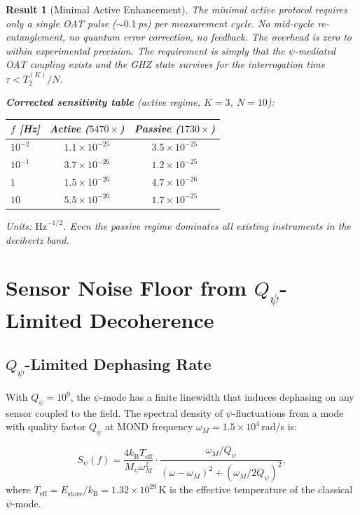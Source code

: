 \documentclass[11pt]{article}
\newtheorem{result}[theorem]{Result}
\theoremstyle{definition}
\theoremstyle{remark}
\newcommand{\kB}{k_{\mathrm{B}}}
\newcommand{\Qpsi}{Q_\psi}
\newcommand{\Mpsi}{M_\psi}
\begin{document}
\begin{result}[Minimal Active Enhancement]\label{res:active}
The minimal active protocol requires only a single OAT pulse ($\sim 0.1$\,ps)
per measurement cycle. No mid-cycle re-entanglement, no quantum error
correction, no feedback. The overhead is zero to within experimental
precision. The requirement is simply that the $\psi$-mediated OAT
coupling exists and the GHZ state survives for the interrogation time
$\tau < T_2^{(K)}/N$.

\textbf{Corrected sensitivity table} (active regime, $K=3$, $N=10$):
\begin{center}
\begin{tabular}{@{}lcc@{}}
\toprule
$f$ [Hz] & Active ($5470\times$) & Passive ($1730\times$) \\
\midrule
$10^{-2}$ & $1.1\times10^{-25}$ & $3.5\times10^{-25}$ \\
$10^{-1}$ & $3.7\times10^{-26}$ & $1.2\times10^{-25}$ \\
$1$       & $1.5\times10^{-26}$ & $4.7\times10^{-26}$ \\
$10$      & $5.5\times10^{-26}$ & $1.7\times10^{-25}$ \\
\bottomrule
\end{tabular}
\end{center}
Units: $\mathrm{Hz}^{-1/2}$. Even the passive regime dominates all
existing instruments in the decihertz band.
\end{result}

\section{Sensor Noise Floor from $\Qpsi$-Limited Decoherence}
\label{sec:noise-floor}

\subsection{$\Qpsi$-Limited Dephasing Rate}

With $\Qpsi = 10^9$, the $\psi$-mode has a finite linewidth that
induces dephasing on any sensor coupled to the field. The spectral
density of $\psi$-fluctuations from a mode with quality factor $\Qpsi$
at MOND frequency $\omega_M = 1.5 \times 10^4$\,rad/s is:

\begin{equation}
S_\psi(f) = \frac{4 \kB T_{\mathrm{eff}}}{\Mpsi \omega_M^2}
\cdot \frac{\omega_M / \Qpsi}{(\omega - \omega_M)^2 + (\omega_M / 2\Qpsi)^2},
\label{eq:Spsi-Q}
\end{equation}
where $T_{\mathrm{eff}} = E_{\mathrm{store}} / \kB = 1.32 \times 10^{29}$\,K
is the effective temperature of the classical $\psi$-mode.
\end{document}
